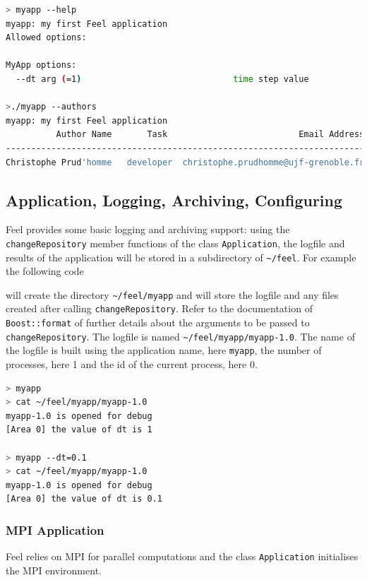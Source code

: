\documentclass[a4paper]{book}
\newcommand{\feel}{Feel\xspace}
\begin{document}
\begin{lstlisting}[language=sh]
> myapp --help
myapp: my first Feel application
Allowed options:

MyApp options:
  --dt arg (=1)                              time step value

>./myapp --authors
myapp: my first Feel application
          Author Name       Task                          Email Address
-----------------------------------------------------------------------
Christophe Prud'homme   developer  christophe.prudhomme@ujf-grenoble.fr
\end{lstlisting}

\subsection{Application, Logging, Archiving, Configuring}
\label{sec:appl-logg-arch}

\feel provides some basic logging and archiving support: using the
\lstinline!changeRepository! member functions of the class
\lstinline!Application!, the logfile and results of the application
will be stored in a subdirectory of \lstinline!~/feel!. For
example the following code



will create the directory \lstinline!~/feel/myapp! and will store the
logfile and any files created after calling
\lstinline!changeRepository!. Refer to the documentation of
\lstinline!Boost::format! of further details about the arguments to be
passed to \lstinline!changeRepository!. The logfile is named
\lstinline!~/feel/myapp/myapp-1.0!. The name of the logfile is built
using the application name, here \lstinline!myapp!, the number of
processes, here 1 and the id of the current process, here 0.

\begin{lstlisting}[language=sh]
> myapp
> cat ~/feel/myapp/myapp-1.0
myapp-1.0 is opened for debug
[Area 0] the value of dt is 1

> myapp --dt=0.1
> cat ~/feel/myapp/myapp-1.0
myapp-1.0 is opened for debug
[Area 0] the value of dt is 0.1
\end{lstlisting}

\subsubsection{MPI Application}

\feel relies on MPI for parallel computations and the class
\lstinline!Application!  initialises the MPI environment.
\end{document}
